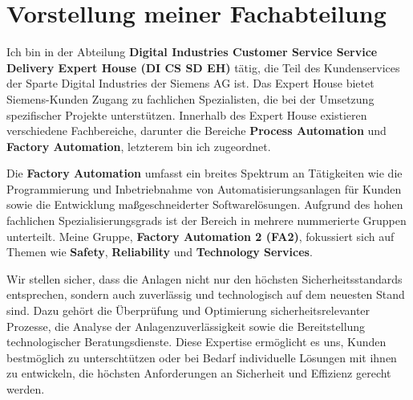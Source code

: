\chapter{Vorstellung meiner Fachabteilung}\label{ch:data}

\label{sec:Vorstellung meiner Fachabteilung}

Ich bin in der Abteilung \textbf{Digital Industries Customer Service Service Delivery Expert House (DI CS SD EH)} tätig, die Teil des 
Kundenservices der Sparte Digital Industries der Siemens AG ist. Das Expert House bietet Siemens-Kunden Zugang zu fachlichen Spezialisten, 
die bei der Umsetzung spezifischer Projekte unterstützen. Innerhalb des Expert House existieren verschiedene Fachbereiche, darunter die 
Bereiche \textbf{Process Automation} und \textbf{Factory Automation}, letzterem bin ich zugeordnet.

Die \textbf{Factory Automation} umfasst ein breites Spektrum an Tätigkeiten wie die Programmierung und Inbetriebnahme von Automatisierungsanlagen 
für Kunden sowie die Entwicklung maßgeschneiderter Softwarelösungen. Aufgrund des hohen fachlichen Spezialisierungsgrads ist der Bereich in 
mehrere nummerierte Gruppen unterteilt. Meine Gruppe, \textbf{Factory Automation 2 (FA2)}, fokussiert sich auf Themen wie 
\textbf{Safety}, \textbf{Reliability} und \textbf{Technology Services}. 

Wir stellen sicher, dass die Anlagen nicht nur den höchsten Sicherheitsstandards entsprechen, sondern auch zuverlässig und 
technologisch auf dem neuesten Stand sind. Dazu gehört die Überprüfung und Optimierung sicherheitsrelevanter Prozesse, die Analyse der 
Anlagenzuverlässigkeit sowie die Bereitstellung technologischer Beratungsdienste. Diese Expertise ermöglicht es uns, Kunden bestmöglich zu unterschtützen 
oder bei Bedarf individuelle Lösungen mit ihnen zu entwickeln, die höchsten Anforderungen an Sicherheit und Effizienz gerecht werden.


